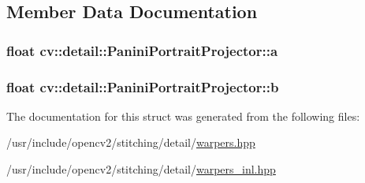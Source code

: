 \subsection{Member Data Documentation}
\hypertarget{structcv_1_1detail_1_1PaniniPortraitProjector_abf6e99d637de8f252a1d879e628fac12}{
\subsubsection[{a}]{\setlength{\rightskip}{0pt plus 5cm}float cv\-::detail\-::\-Panini\-Portrait\-Projector\-::a}}\label{structcv_1_1detail_1_1PaniniPortraitProjector_abf6e99d637de8f252a1d879e628fac12}
\hypertarget{structcv_1_1detail_1_1PaniniPortraitProjector_aa09f1183c0aeab50953a3bf75b087755}{
\subsubsection[{b}]{\setlength{\rightskip}{0pt plus 5cm}float cv\-::detail\-::\-Panini\-Portrait\-Projector\-::b}}\label{structcv_1_1detail_1_1PaniniPortraitProjector_aa09f1183c0aeab50953a3bf75b087755}


The documentation for this struct was generated from the following files\-:\begin{DoxyCompactItemize}
\item 
/usr/include/opencv2/stitching/detail/\hyperlink{detail_2warpers_8hpp}{warpers.\-hpp}\item 
/usr/include/opencv2/stitching/detail/\hyperlink{warpers__inl_8hpp}{warpers\-\_\-inl.\-hpp}\end{DoxyCompactItemize}
